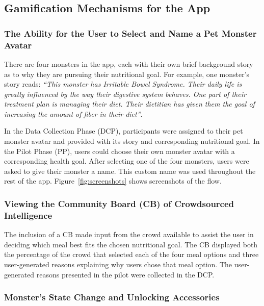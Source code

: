 \vspace{-5pt}
\subsection{Gamification Mechanisms for the App}
\subsubsection{The Ability for the User to Select and Name a Pet Monster Avatar} 
There are four monsters in the app, each with their own brief background story as to why they are pursuing their nutritional goal. 
For example, one monster's story reads: \textit{``This monster has Irritable Bowel Syndrome. Their daily life is greatly influenced by the way their digestive system behaves. One part of their treatment plan is managing their diet. Their dietitian has given them the goal of increasing the amount of fiber in their diet''}. 

In the Data Collection Phase (DCP), participants were assigned to their pet monster avatar and provided with its story and corresponding nutritional goal. In the Pilot Phase (PP), users could choose their own monster avatar with a corresponding health goal. After selecting one of the four monsters, users were asked to give their monster a name. 
This custom name was used throughout the rest of the app. Figure~\ref{fig:screenshots} shows screenshots of the flow.


\vspace{-5pt}
\subsubsection{Viewing the Community Board (CB) of Crowdsourced Intelligence}

The inclusion of a CB made input from the crowd available to assist the user in deciding which meal best fits the chosen nutritional goal. 
The CB displayed both the percentage of the crowd that selected each of the four meal options and three user-generated reasons explaining why users chose that meal option. The user-generated reasons presented in the pilot were collected in the DCP. 




\vspace{-5pt}
\subsubsection{Monster's State Change and Unlocking Accessories} 

